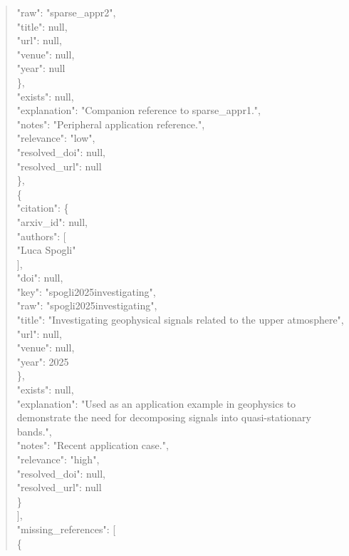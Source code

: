 \documentclass[11pt]{article}
\begin{document}
\begin{quote}
        "raw": "sparse\_appr2",\\
        "title": null,\\
        "url": null,\\
        "venue": null,\\
        "year": null\\
      \},\\
      "exists": null,\\
      "explanation": "Companion reference to sparse\_appr1.",\\
      "notes": "Peripheral application reference.",\\
      "relevance": "low",\\
      "resolved\_doi": null,\\
      "resolved\_url": null\\
    \},\\
    \{\\
      "citation": \{\\
        "arxiv\_id": null,\\
        "authors": [\\
          "Luca Spogli"\\
        ],\\
        "doi": null,\\
        "key": "spogli2025investigating",\\
        "raw": "spogli2025investigating",\\
        "title": "Investigating geophysical signals related to the upper atmosphere",\\
        "url": null,\\
        "venue": null,\\
        "year": 2025\\
      \},\\
      "exists": null,\\
      "explanation": "Used as an application example in geophysics to demonstrate the need for decomposing signals into quasi-stationary bands.",\\
      "notes": "Recent application case.",\\
      "relevance": "high",\\
      "resolved\_doi": null,\\
      "resolved\_url": null\\
    \}\\
  ],\\
  "missing\_references": [\\
    \{\\

\end{quote}
\end{document}
